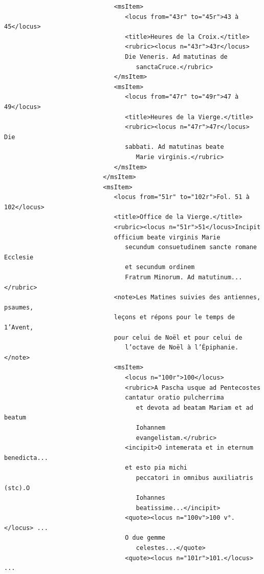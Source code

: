 \documentclass[a4paper,12pt,twoside]{book}
\begin{document}
\begin{verbatim}
                              <msItem>
                                 <locus from="43r" to="45r">43 à 45</locus>
                                 <title>Heures de la Croix.</title>
                                 <rubric><locus n="43r">43r</locus> 
                                 Die Veneris. Ad matutinas de
                                    sanctaCruce.</rubric>
                              </msItem>
                              <msItem>
                                 <locus from="47r" to="49r">47 à 49</locus>
                                 <title>Heures de la Vierge.</title>
                                 <rubric><locus n="47r">47r</locus> Die 
                                 sabbati. Ad matutinas beate
                                    Marie virginis.</rubric>
                              </msItem>
                           </msItem>
                           <msItem>
                              <locus from="51r" to="102r">Fol. 51 à 102</locus>
                              <title>Office de la Vierge.</title>
                              <rubric><locus n="51r">51</locus>Incipit 
                              officium beate virginis Marie
                                 secundum consuetudinem sancte romane Ecclesie 
                                 et secundum ordinem
                                 Fratrum Minorum. Ad matutinum...</rubric>
                              <note>Les Matines suivies des antiennes, psaumes, 
                              leçons et répons pour le temps de 1’Avent, 
                              pour celui de Noël et pour celui de
                                 l’octave de Noël à l’Épiphanie.</note>
                              <msItem>
                                 <locus n="100r">100</locus>
                                 <rubric>A Pascha usque ad Pentecostes 
                                 cantatur oratio pulcherrima
                                    et devota ad beatam Mariam et ad beatum 
                                    Iohannem
                                    evangelistam.</rubric>
                                 <incipit>O intemerata et in eternum benedicta... 
                                 et esto pia michi
                                    peccatori in omnibus auxiliatris (stc).O 
                                    Iohannes
                                    beatissime...</incipit>
                                 <quote><locus n="100v">100 v°.</locus> ...
                                 O due gemme
                                    celestes...</quote>
                                 <quote><locus n="101r">101.</locus> ...

\end{verbatim}
\end{document}
